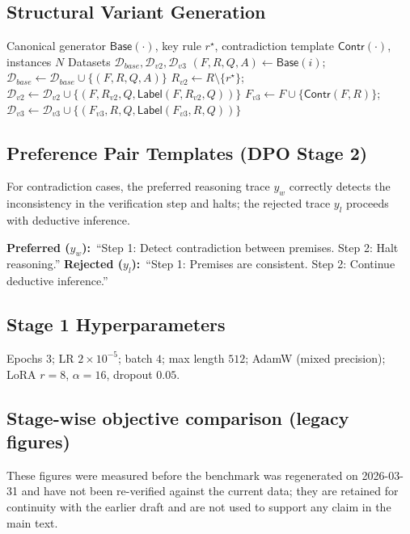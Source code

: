 \documentclass{article}
\begin{document}
\subsection{Structural Variant Generation}
\label{app:variant-gen}

\begin{algorithm}[h]
\caption{Structural Variant Generation (Variant 2 \& 3)}
\label{alg:variant23}
\small
\begin{algorithmic}[1]
\Require Canonical generator $\mathsf{Base}(\cdot)$, key rule $r^\star$, contradiction template $\mathsf{Contr}(\cdot)$, instances $N$
\Ensure Datasets $\mathcal{D}_{base}, \mathcal{D}_{v2}, \mathcal{D}_{v3}$
    \State $(F,R,Q,A) \gets \mathsf{Base}(i)$;\quad $\mathcal{D}_{base} \gets \mathcal{D}_{base} \cup \{(F,R,Q,A)\}$
    \State $R_{v2} \gets R \setminus \{r^\star\}$;\quad $\mathcal{D}_{v2} \gets \mathcal{D}_{v2} \cup \{(F,R_{v2},Q,\mathsf{Label}(F,R_{v2},Q))\}$
    \State $F_{v3} \gets F \cup \{\mathsf{Contr}(F,R)\}$;\quad $\mathcal{D}_{v3} \gets \mathcal{D}_{v3} \cup \{(F_{v3},R,Q,\mathsf{Label}(F_{v3},R,Q))\}$
\EndFor
\end{algorithmic}
\end{algorithm}

\subsection{Preference Pair Templates (DPO Stage 2)}
\label{app:pref-pairs}
For contradiction cases, the preferred reasoning trace $y_w$ correctly detects the inconsistency in the verification step and halts; the rejected trace $y_l$ proceeds with deductive inference.

\textbf{Preferred ($y_w$):}~``Step 1: Detect contradiction between premises. Step 2: Halt reasoning.''\quad
\textbf{Rejected ($y_l$):}~``Step 1: Premises are consistent. Step 2: Continue deductive inference.''

\subsection{Stage 1 Hyperparameters}
\label{app:hyper}
Epochs $3$; LR $2{\times}10^{-5}$; batch $4$; max length $512$; AdamW (mixed precision); LoRA $r{=}8$, $\alpha{=}16$, dropout $0.05$.

\subsection{Stage-wise objective comparison (legacy figures)}
\label{app:stagewise}
These figures were measured before the benchmark was regenerated on
2026-03-31 and have not been re-verified against the current data; they
are retained for continuity with the earlier draft and are not used to
support any claim in the main text.
\end{document}
